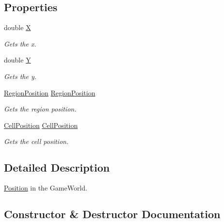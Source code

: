 \subsection*{Properties}
\begin{DoxyCompactItemize}
\item 
double \hyperlink{classCore_1_1Models_1_1Position_a60f236378b77fb83a9b51d92c5d4359f}{X}
\begin{DoxyCompactList}\small\item\em Gets the x. \end{DoxyCompactList}\item 
double \hyperlink{classCore_1_1Models_1_1Position_a795b40cbfc260e222c319cd50b5ab78c}{Y}
\begin{DoxyCompactList}\small\item\em Gets the y. \end{DoxyCompactList}\item 
\hyperlink{classCore_1_1Models_1_1RegionPosition}{Region\+Position} \hyperlink{classCore_1_1Models_1_1Position_a7b92c9b041328e5f660f1a9f137249c6}{Region\+Position}
\begin{DoxyCompactList}\small\item\em Gets the region position. \end{DoxyCompactList}\item 
\hyperlink{classCore_1_1Models_1_1CellPosition}{Cell\+Position} \hyperlink{classCore_1_1Models_1_1Position_afee231a72dbd2f57329e2bdd2fbc25bb}{Cell\+Position}
\begin{DoxyCompactList}\small\item\em Gets the cell position. \end{DoxyCompactList}\end{DoxyCompactItemize}


\subsection{Detailed Description}
\hyperlink{classCore_1_1Models_1_1Position}{Position} in the Game\+World. 



\subsection{Constructor \& Destructor Documentation}
\hypertarget{classCore_1_1Models_1_1Position_ab6b49792138b5a0a22e13525acdacc9a}{}
